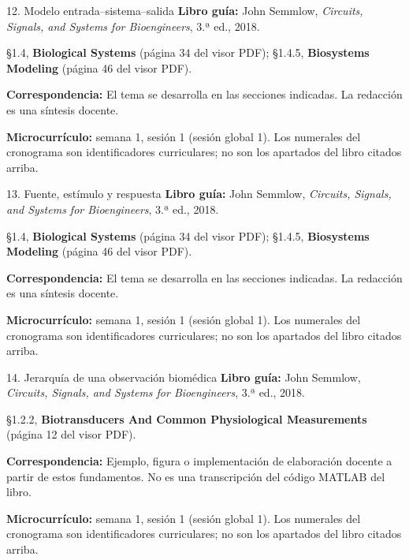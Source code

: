 \documentclass[
  10pt,
  ignorenonframetext,
  aspectratio=169,
  spanish,
]{beamer}
\begin{document}
\begin{frame}{12. Modelo entrada--sistema--salida}
\label{modelo-entradasistemasalida}
\textbf{Libro guía:} John Semmlow, \emph{Circuits, Signals, and Systems
for Bioengineers}, 3.ª ed., 2018.

§1.4, \textbf{Biological Systems} (página 34 del visor PDF); §1.4.5,
\textbf{Biosystems Modeling} (página 46 del visor PDF).

\textbf{Correspondencia:} El tema se desarrolla en las secciones
indicadas. La redacción es una síntesis docente.

\textbf{Microcurrículo:} semana 1, sesión 1 (sesión global 1). Los
numerales del cronograma son identificadores curriculares; no son los
apartados del libro citados arriba.
\end{frame}

\begin{frame}{13. Fuente, estímulo y respuesta}
\label{fuente-estuxedmulo-y-respuesta}
\textbf{Libro guía:} John Semmlow, \emph{Circuits, Signals, and Systems
for Bioengineers}, 3.ª ed., 2018.

§1.4, \textbf{Biological Systems} (página 34 del visor PDF); §1.4.5,
\textbf{Biosystems Modeling} (página 46 del visor PDF).

\textbf{Correspondencia:} El tema se desarrolla en las secciones
indicadas. La redacción es una síntesis docente.

\textbf{Microcurrículo:} semana 1, sesión 1 (sesión global 1). Los
numerales del cronograma son identificadores curriculares; no son los
apartados del libro citados arriba.
\end{frame}

\begin{frame}{14. Jerarquía de una observación biomédica}
\label{jerarquuxeda-de-una-observaciuxf3n-biomuxe9dica}
\textbf{Libro guía:} John Semmlow, \emph{Circuits, Signals, and Systems
for Bioengineers}, 3.ª ed., 2018.

§1.2.2, \textbf{Biotransducers And Common Physiological Measurements}
(página 12 del visor PDF).

\textbf{Correspondencia:} Ejemplo, figura o implementación de
elaboración docente a partir de estos fundamentos. No es una
transcripción del código MATLAB del libro.

\textbf{Microcurrículo:} semana 1, sesión 1 (sesión global 1). Los
numerales del cronograma son identificadores curriculares; no son los
apartados del libro citados arriba.
\end{frame}
\end{document}
